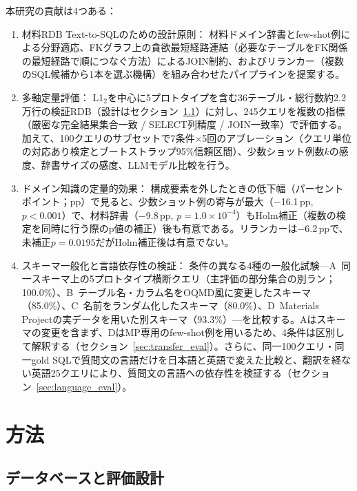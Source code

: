 \documentclass[twocolumn]{interact}
\begin{document}
本研究の貢献は4つある：
\begin{enumerate}[label=(\roman*)]
  \item 材料RDB Text-to-SQLのための設計原則：
    材料ドメイン辞書とfew-shot例による分野適応、FKグラフ上の貪欲最短経路連結（必要なテーブルをFK関係の最短経路で順につなぐ方法）によるJOIN制約、およびリランカー（複数のSQL候補から1本を選ぶ機構）を組み合わせたパイプラインを提案する。
  \item 多軸定量評価：
    L1$_2$を中心に5プロトタイプを含む36テーブル・総行数約2.2万行の検証RDB（設計はセクション~\ref{sec:evaluation}）に対し、245クエリを複数の指標（厳密な完全結果集合一致 / SELECT列精度 / JOIN一致率）で評価する。加えて、100クエリのサブセットで7条件$\times$5回のアブレーション（クエリ単位の対応あり検定とブートストラップ95\%信頼区間）、少数ショット例数$k$の感度、辞書サイズの感度、LLMモデル比較を行う。
  \item ドメイン知識の定量的効果：
    構成要素を外したときの低下幅（パーセントポイント；pp）で見ると、少数ショット例の寄与が最大（$-$16.1\,pp, $p<0.001$）で、材料辞書（$-$9.8\,pp, $p=1.0\times10^{-4}$）もHolm補正（複数の検定を同時に行う際のp値の補正）後も有意である。リランカーは$-$6.2\,ppで、未補正$p=0.0195$だがHolm補正後は有意でない。
  \item スキーマ一般化と言語依存性の検証：
    条件の異なる4種の一般化試験---A~同一スキーマ上の5プロトタイプ横断クエリ（主評価の部分集合の別ラン；100.0\%）、B~テーブル名・カラム名をOQMD風に変更したスキーマ（85.0\%）、C~名前をランダム化したスキーマ（80.0\%）、D~Materials Projectの実データを用いた別スキーマ（93.3\%）---を比較する。Aはスキーマの変更を含まず、DはMP専用のfew-shot例を用いるため、4条件は区別して解釈する（セクション~\ref{sec:transfer_eval}）。さらに、同一100クエリ・同一gold SQLで質問文の言語だけを日本語と英語で変えた比較と、翻訳を経ない英語25クエリにより、質問文の言語への依存性を検証する（セクション~\ref{sec:language_eval}）。
\end{enumerate}


\section{方法}
\label{sec:method}

\subsection{データベースと評価設計}
\label{sec:evaluation}  
\end{document}
